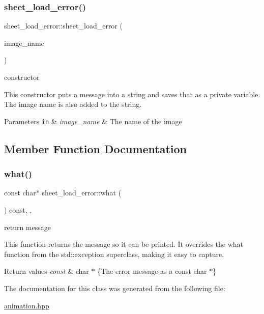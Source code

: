 \subsubsection{\texorpdfstring{sheet\+\_\+load\+\_\+error()}{sheet\_load\_error()}}
{\footnotesize\ttfamily sheet\+\_\+load\+\_\+error\+::sheet\+\_\+load\+\_\+error (\begin{DoxyParamCaption}\item[{const std\+::string \&}]{image\+\_\+name }\end{DoxyParamCaption})\hspace{0.3cm}{\ttfamily [inline]}}



constructor 

This constructor puts a message into a string and saves that as a private variable. The image name is also added to the string.


\begin{DoxyParams}[1]{Parameters}
\mbox{\tt in}  & {\em image\+\_\+name} & The name of the image \\
\hline
\end{DoxyParams}


\subsection{Member Function Documentation}
\mbox{\label{classsheet__load__error_a57dd1a273a0720e58ec0eb667d0c85aa}} 
\subsubsection{\texorpdfstring{what()}{what()}}
{\footnotesize\ttfamily const char$\ast$ sheet\+\_\+load\+\_\+error\+::what (\begin{DoxyParamCaption}{ }\end{DoxyParamCaption}) const\hspace{0.3cm}{\ttfamily [inline]}, {\ttfamily [override]}, {\ttfamily [noexcept]}}



return message 

This function returns the message so it can be printed. It overrides the what function from the std\+::exception superclass, making it easy to capture.


\begin{DoxyRetVals}{Return values}
{\em const} & char $\ast$ \{The error message as a const char $\ast$\} \\
\hline
\end{DoxyRetVals}


The documentation for this class was generated from the following file\+:\begin{DoxyCompactItemize}
\item 
\hyperlink{animation_8hpp}{animation.\+hpp}\end{DoxyCompactItemize}
